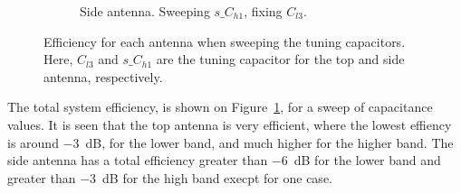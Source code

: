 \begin{figure}[htbp]
\begin{subfigure}{0.49\linewidth}
        \caption{Side antenna. Sweeping $s\_C_{h1}$, fixing $C_{l3}$.}
    \end{subfigure}
    \caption{Efficiency for each antenna when sweeping the tuning capacitors. Here, $C_{l3}$ and $s\_C_{h1}$ are the tuning capacitor for the top and side antenna, respectively.}
    \label{fig:eff_sol3}
\end{figure}
The total system efficiency, is shown on Figure~\ref{fig:eff_sol3}, for a sweep of capacitance values. It is seen that the top antenna is very efficient, where the lowest effiency is around \SI{-3}{dB}, for the lower band, and much higher for the higher band. The side antenna has a total efficiency greater than \SI{-6}{dB} for the lower band and greater than \SI{-3}{dB} for the high band execpt for one case.


